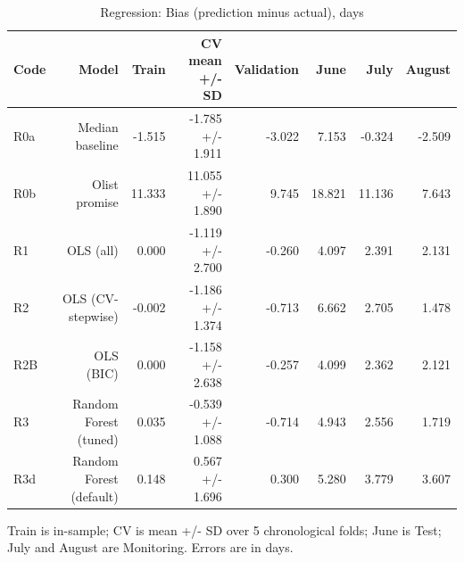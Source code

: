 \begin{table}[htbp]
\centering
\small
\caption{Regression: Bias (prediction minus actual), days}
\begin{tabular}{lrrrrrrr}
\toprule
Code & Model & Train & CV mean +/- SD & Validation & June & July & August \\
\midrule
R0a & Median baseline & -1.515 & -1.785 +/- 1.911 & -3.022 & 7.153 & -0.324 & -2.509 \\
R0b & Olist promise & 11.333 & 11.055 +/- 1.890 & 9.745 & 18.821 & 11.136 & 7.643 \\
R1 & OLS (all) & 0.000 & -1.119 +/- 2.700 & -0.260 & 4.097 & 2.391 & 2.131 \\
R2 & OLS (CV-stepwise) & -0.002 & -1.186 +/- 1.374 & -0.713 & 6.662 & 2.705 & 1.478 \\
R2B & OLS (BIC) & 0.000 & -1.158 +/- 2.638 & -0.257 & 4.099 & 2.362 & 2.121 \\
R3 & Random Forest (tuned) & 0.035 & -0.539 +/- 1.088 & -0.714 & 4.943 & 2.556 & 1.719 \\
R3d & Random Forest (default) & 0.148 & 0.567 +/- 1.696 & 0.300 & 5.280 & 3.779 & 3.607 \\
\bottomrule
\end{tabular}
\par\smallskip\begin{minipage}{\linewidth}\footnotesize Train is in-sample; CV is mean +/- SD over 5 chronological folds; June is Test; July and August are Monitoring. Errors are in days.\end{minipage}
\end{table}

